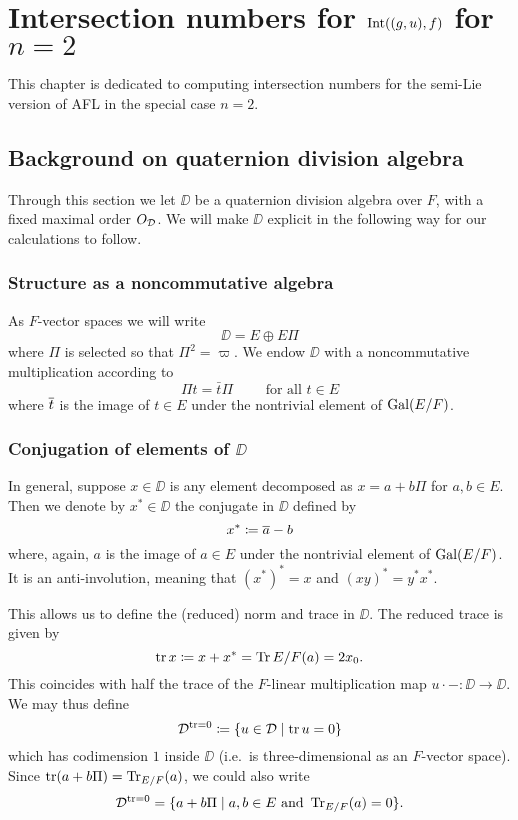 \chapter{Intersection numbers for $\operatorname{Int}((g,u), f)$ for $n = 2$}
This chapter is dedicated to computing intersection numbers
for the semi-Lie version of AFL in the special case $n = 2$.

\section{Background on quaternion division algebra}
Through this section we let $\DD$ be a quaternion division algebra over $F$,
with a fixed maximal order $O_\mathcal D$.
We will make $\DD$ explicit in the following way for our calculations to follow.

\subsection{Structure as a noncommutative algebra}
As $F$-vector spaces we will write
\[ \DD = E \oplus E \Pi \]
where $\Pi$ is selected so that $\Pi^2 = \varpi$.
We endow $\DD$ with a noncommutative multiplication according to
\[ \Pi t = \bar t \Pi \qquad \text{ for all } t \in E \]
where $\overline{t}$ is the image of $t \in E$ under the nontrivial element of $\operatorname{Gal}(E/F)$.

\subsection{Conjugation of elements of $\DD$}
In general, suppose $x \in \DD$ is any element
decomposed as $x = a + b \Pi$ for $a,b \in E$.
Then we denote by $x^\ast \in \DD$ the conjugate in $\DD$ defined by
\[ x^\ast \coloneqq \overline{a} - b \]
where, again, $a$ is the image of $a \in E$ under the nontrivial element of $\operatorname{Gal}(E/F)$.
It is an anti-involution, meaning that $(x^\ast)^\ast = x$ and $(xy)^\ast = y^\ast x^\ast$.

This allows us to define the (reduced) norm and trace in $\DD$.
The reduced trace is given by
\[ \operatorname{tr} x \coloneqq x + x^\ast = \operatorname{Tr}{E/F}(a) = 2x_0. \]
This coincides with half the trace of the
$F$-linear multiplication map $u \cdot - \colon \DD \to \DD$.
We may thus define
\[ \mathcal D^{\operatorname{tr} = 0} \coloneqq \left\{ u \in \mathcal D \mid \operatorname{tr} u = 0 \right\} \]
which has codimension $1$ inside $\DD$ (i.e.\ is three-dimensional as an $F$-vector space).
Since $\operatorname{tr}(a+b\Pi) = \operatorname{Tr}_{E/F}(a)$, we could also write
\[ \mathcal D^{\operatorname{tr} = 0} = \{ a+b\Pi \mid a,b \in E \text{ and } \operatorname{Tr}_{E/F}(a) = 0 \}. \]


